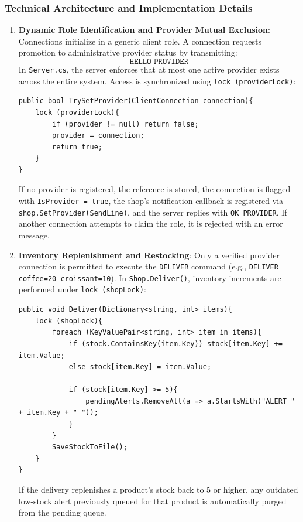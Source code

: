 \documentclass[11pt,a4paper]{article}
\begin{document}
\subsubsection{Technical Architecture and Implementation Details}
\begin{enumerate}
    \item \textbf{Dynamic Role Identification and Provider Mutual Exclusion}:
    Connections initialize in a generic client role. A connection requests promotion to administrative provider status by transmitting:
    $$\texttt{HELLO PROVIDER}$$
    In \texttt{Server.cs}, the server enforces that at most one active provider exists across the entire system. Access is synchronized using \texttt{lock (providerLock)}:
    \begin{lstlisting}[language={[Sharp]C}]
public bool TrySetProvider(ClientConnection connection){
    lock (providerLock){
        if (provider != null) return false;
        provider = connection;
        return true;
    }
}
    \end{lstlisting}
    If no provider is registered, the reference is stored, the connection is flagged with \texttt{IsProvider = true}, the shop's notification callback is registered via \texttt{shop.SetProvider(SendLine)}, and the server replies with \texttt{OK PROVIDER}. If another connection attempts to claim the role, it is rejected with an error message.

    \item \textbf{Inventory Replenishment and Restocking}:
    Only a verified provider connection is permitted to execute the \texttt{DELIVER} command (e.g., \texttt{DELIVER coffee=20 croissant=10}). In \texttt{Shop.Deliver()}, inventory increments are performed under \texttt{lock (shopLock)}:
    \begin{lstlisting}[language={[Sharp]C}]
public void Deliver(Dictionary<string, int> items){
    lock (shopLock){
        foreach (KeyValuePair<string, int> item in items){
            if (stock.ContainsKey(item.Key)) stock[item.Key] += item.Value;
            else stock[item.Key] = item.Value;

            if (stock[item.Key] >= 5){
                pendingAlerts.RemoveAll(a => a.StartsWith("ALERT " + item.Key + " "));
            }
        }
        SaveStockToFile();
    }
}
    \end{lstlisting}
    If the delivery replenishes a product's stock back to 5 or higher, any outdated low-stock alert previously queued for that product is automatically purged from the pending queue.


\end{enumerate}
\end{document}
